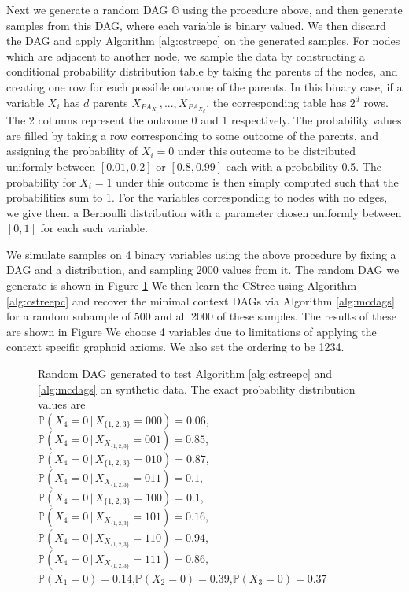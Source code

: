 \documentclass{tufte-book}
\begin{document}
Next we generate a random DAG \(\mathbb{G}\) using the procedure above, and then generate samples from this DAG, where each variable is binary valued. We then discard the DAG and apply Algorithm \ref{alg:cstreepc} on the generated samples. For nodes which are adjacent to another node, we sample the data by constructing a conditional probability distribution table by taking the parents of the nodes, and creating one row for each possible outcome of the parents. In this binary case, if a variable \(X_i\) has \(d\) parents \(X_{PA_{X_1}},...,X_{PA_{X_d}}\), the corresponding table has \(2^d\) rows. The 2 columns represent the outcome 0 and 1 respectively. The probability values are filled by taking a row corresponding to some outcome of the parents, and assigning the probability of \(X_i=0\) under this outcome to be distributed uniformly between \([0.01,0.2]\) or \([0.8,0.99]\) each with a probability 0.5. The probability for \(X_i=1\) under this outcome is then simply computed such that the probabilities sum to 1. For the variables corresponding to nodes with no edges, we give them a Bernoulli distribution with a parameter chosen uniformly between \([0,1]\) for each such variable.



We simulate samples on 4 binary variables using the above procedure by fixing a DAG and a distribution, and sampling 2000 values from it. The random DAG we generate is shown in Figure \ref{fig:syntheticdag} We then learn the CStree using Algorithm \ref{alg:cstreepc} and recover the minimal context DAGs via Algorithm \ref{alg:mcdags} for a random subample of 500 and all 2000 of these samples. The results of these are shown in Figure  We choose 4 variables due to limitations of applying the context specific graphoid axioms. We also set the ordering to be 1234.

\begin{figure}[]\label{fig:syntheticdag}
 \centering
{}%
\caption{Random DAG generated to test Algorithm \ref{alg:cstreepc} and \ref{alg:mcdags} on synthetic data. The exact probability distribution values are\\ $\mathbb{P}(X_4=0\,|\,X_{\{1,2,3\}}=000)=0.06$,\\ $\mathbb{P}(X_4=0\,|\,X_X_{\{1,2,3\}}=001)=0.85$,\\
$\mathbb{P}(X_4=0\,|\,X_{\{1,2,3\}}=010)=0.87$,\\ $\mathbb{P}(X_4=0\,|\,X_X_{\{1,2,3\}}=011)=0.1$,\\
$\mathbb{P}(X_4=0\,|\,X_{\{1,2,3\}}=100)=0.1$,\\ $\mathbb{P}(X_4=0\,|\,X_X_{\{1,2,3\}}=101)=0.16$,\\
$\mathbb{P}(X_4=0\,|\,X_X_{\{1,2,3\}}=110)=0.94$,\\
$\mathbb{P}(X_4=0\,|\,X_X_{\{1,2,3\}}=111)=0.86$,\\
$\mathbb{P}(X_1=0)=0.14$,$\mathbb{P}(X_2=0)=0.39$,$\mathbb{P}(X_3=0)=0.37$}

\end{figure}
\end{document}

